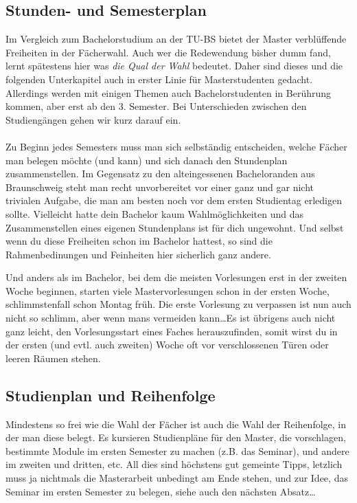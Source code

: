 
\subsection{Stunden- und Semesterplan}
 
Im Vergleich zum Bachelorstudium an der TU-BS bietet der Master
verblüffende Freiheiten in der Fächerwahl. Auch wer die Redewendung
bisher dumm fand, lernt spätestens hier was \emph{die Qual der Wahl}
bedeutet. Daher sind dieses und die folgenden Unterkapitel auch in erster
Linie für Masterstudenten gedacht. Allerdings werden mit einigen
Themen auch Bachelorstudenten in Berührung kommen, aber erst ab den
3. Semester. Bei Unterschieden zwischen den Studiengängen gehen wir
kurz darauf ein.\\\\
Zu Beginn jedes Semesters muss man sich selbständig entscheiden, welche Fächer man belegen möchte (und kann) und sich danach den Stundenplan zusammenstellen. Im Gegensatz zu den alteingessenen Bacheloranden aus Braunschweig steht man recht unvorbereitet vor einer ganz und gar nicht trivialen Aufgabe, die man am besten noch vor dem ersten Studientag erledigen sollte. Vielleicht hatte dein Bachelor kaum Wahlmöglichkeiten und das Zusammenstellen eines eigenen Stundenplans ist für dich ungewohnt. Und selbst wenn du diese Freiheiten schon im Bachelor hattest, so sind die Rahmenbedinungen und Feinheiten hier sicherlich ganz andere.

Und anders als im Bachelor, bei dem die meisten Vorlesungen erst in der zweiten Woche beginnen, starten viele Mastervorlesungen schon in der ersten Woche, schlimmstenfall schon Montag früh. Die erste Vorlesung zu verpassen ist nun auch nicht so schlimm, aber wenn mans vermeiden kann\ldots Es ist übrigens auch nicht ganz leicht, den Vorlesungsstart eines Faches herauszufinden, somit wirst du in der ersten (und evtl. auch zweiten) Woche oft vor verschlossenen Türen oder leeren Räumen stehen.







\subsection{Studienplan und Reihenfolge}
Mindestens so frei wie die Wahl der Fächer ist auch die Wahl der Reihenfolge, in der man diese belegt. Es kursieren Studienpläne für den Master, die vorschlagen, bestimmte Module im ersten Semester zu machen (z.B. das Seminar), und andere im zweiten und dritten, etc. All dies sind höchstens gut gemeinte Tipps, letzlich muss ja nichtmals die Masterarbeit unbedingt am Ende stehen, und zur Idee, das Seminar im ersten Semester zu belegen, siehe auch den nächsten Absatz\ldots
          



